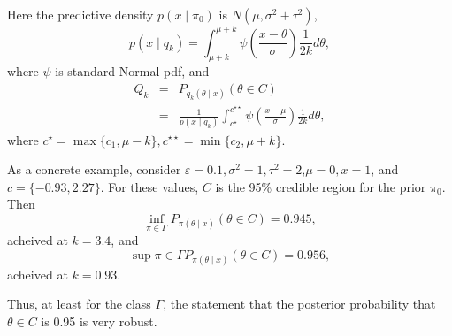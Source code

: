 \documentclass[12pt]{article}
\begin{document}
Here the predictive density $p(x\mid \pi_0)$
is $N(\mu,\sigma^2 + \tau^2)$,
$$p(x\mid q_k)=\int_{\mu+k}^{\mu+k} \psi \left(
  \frac{x-\theta}{\sigma} \right) \frac{1}{2k} d\theta,$$
where $\psi$ is standard Normal pdf, and
\begin{eqnarray*}
Q_k&=&P_{q_k(\theta \mid x)}(\theta \in C)\\
&=&\frac{1}{p(x \mid q_k)} \int_{c^\star}^{c^{\star \star}} \psi
\left( \frac{x-\mu}{\sigma} \right) \frac{1}{2k} d\theta,
\end{eqnarray*}
where $c^{\star}=\max\{ c_1,\mu-k\},c^{\star \star}=\min\{ c_2,\mu+k\}$.

As a
concrete example, consider
$\varepsilon=0.1,\sigma^2=1,\tau^2=2$,$\mu=0,x=1$, and
$c=\{-0.93,2.27\}$.  For these values, $C$ is the 95\% credible region
for the prior $\pi_0$.  Then
$$\inf_{\pi \in \Gamma}{P_{\pi(\theta \mid x)} (\theta \in C)} =0.945,$$
acheived at $k=3.4$, and
$$\sup{\pi \in \Gamma}{P_{\pi(\theta \mid x)} (\theta \in C)} =0.956,$$
acheived at $k=0.93$.

Thus, at least for the class $\Gamma$, the
statement that the posterior probability that $\theta \in C$ is 0.95
is very robust.
\end{document}
